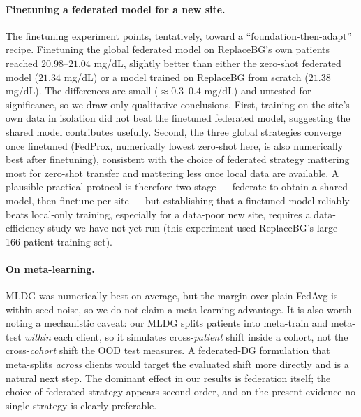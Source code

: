 \documentclass[10pt,letterpaper]{article}
\begin{document}
\paragraph{Finetuning a federated model for a new site.} The finetuning
experiment points, tentatively, toward a ``foundation-then-adapt'' recipe.
Finetuning the global federated model on ReplaceBG's own patients reached
$20.98$--$21.04$ mg/dL, slightly better than either the zero-shot federated model
($21.34$ mg/dL) or a model trained on ReplaceBG from scratch ($21.38$ mg/dL). The
differences are small ($\approx 0.3$--$0.4$ mg/dL) and untested for significance,
so we draw only qualitative conclusions. First, training on the site's own data
in isolation did not beat the finetuned federated model, suggesting the shared
model contributes usefully. Second, the three global strategies converge once
finetuned (FedProx, numerically lowest zero-shot here, is also numerically best
after finetuning), consistent with the choice of federated strategy mattering
most for zero-shot transfer and mattering less once local data are available. A
plausible practical protocol is therefore two-stage --- federate to obtain a
shared model, then finetune per site --- but establishing that a finetuned model
reliably beats local-only training, especially for a data-poor new site, requires
a data-efficiency study we have not yet run (this experiment used ReplaceBG's
large 166-patient training set).

\paragraph{On meta-learning.} MLDG was numerically best on average, but the
margin over plain FedAvg is within seed noise, so we do not claim a meta-learning
advantage. It is also worth noting a mechanistic caveat: our MLDG splits patients
into meta-train and meta-test \emph{within} each client, so it simulates
cross-\emph{patient} shift inside a cohort, not the cross-\emph{cohort} shift the
OOD test measures. A federated-DG formulation that meta-splits \emph{across}
clients would target the evaluated shift more directly and is a natural next
step. The dominant effect in our results is federation itself; the choice of
federated strategy appears second-order, and on the present evidence no single
strategy is clearly preferable.
\end{document}
